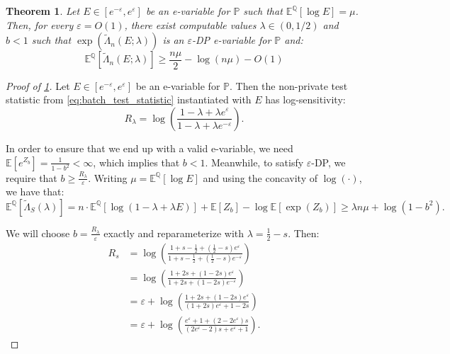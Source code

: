 \documentclass[10pt,a4paper]{amsart}
\newtheorem{theorem}{Theorem}
\newcommand{\Alt}{\mathbb{Q}}
\newcommand{\E}{\mathbb{E}}
\newcommand{\Null}{\mathbb{P}}
\newcommand{\eps}{\varepsilon}
\begin{document}
\begin{theorem}\label{thm:basic-batch-symmetric}
    Let $E \in [e^{-\eps}, e^\eps]$ be an e-variable for $\Null$ such that $\E^\Alt[\log E] = \mu$. Then, for every $\eps = O(1)$, there exist computable values $\lambda \in (0, 1/2)$ and $b<1$ such that $\exp(\tilde \Lambda_n(E;\lambda))$ is an $\eps$-DP e-variable for $\Null$ and:
    \begin{equation*}
        \E^\Alt[\tilde \Lambda_n(E; \lambda)] \geq \frac{n\mu}{2} - \log(n\mu) - O(1)
    \end{equation*}
\end{theorem}

\begin{proof}[Proof of \cref{thm:basic-batch-symmetric}]
Let $E \in [e^{-\eps}, e^\eps]$ be an e-variable for $\Null$. Then
the non-private test statistic from \cref{eq:batch_test_statistic} instantiated with $E$ has log-sensitivity:
    \begin{equation*}
        R_\lambda = \log \left( \frac{1-\lambda+\lambda e^{\varepsilon}}{1-\lambda+\lambda e^{-\varepsilon}} \right).
    \end{equation*}

In order to ensure that we end up with a valid e-variable, we need $\mathbb{E}[e^{Z_b}] = \frac{1}{1-b^2} < \infty$, which implies that $b < 1$. Meanwhile, to satisfy $\varepsilon$-DP, we require that $b \geq \frac{R_\lambda}{\varepsilon}$. Writing $\mu = \E^\Alt[\log E]$ and using the concavity of $\log(\cdot)$, we have that:
    \begin{equation*}
        \mathbb{E}^\Alt[\tilde \Lambda_S(\lambda)] = n \cdot\mathbb{E}^\Alt[\log(1-\lambda+\lambda E)] + \mathbb{E}[Z_b] - \log \mathbb{E}[\exp(Z_b)] \geq \lambda n \mu + \log (1-b^2).
    \end{equation*}

    We will choose $b = \frac{R_\lambda}{\varepsilon}$ exactly and reparameterize with $\lambda = \frac{1}{2} - s$. Then:
    \begin{align*}
        R_s &= \log \left( \frac{1 + s - \frac{1}{2} + (\frac{1}{2}-s)e^\varepsilon}{1 + s - \frac{1}{2} + (\frac{1}{2}-s)e^{-\varepsilon}} \right) \\
        &= \log \left( \frac{1 + 2s + (1-2s)e^\varepsilon}{1 + 2s + (1-2s)e^{-\varepsilon}} \right) \\
        &= \varepsilon+ \log \left( \frac{1 + 2s + (1-2s)e^\varepsilon}{(1 + 2s)e^\varepsilon + 1-2s} \right) \\
        &= \varepsilon+ \log \left( \frac{e^\varepsilon+1 + (2-2e^\varepsilon)s}{(2e^\varepsilon-2)s + e^\varepsilon+1} \right).
    \end{align*}


\end{proof}
\end{document}
